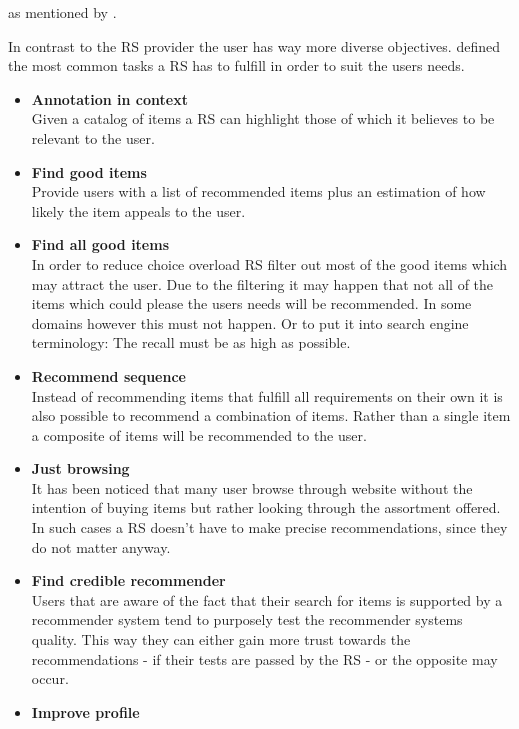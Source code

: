 as mentioned by \citeauthor{ricci:2011}.\citep[p.~4-5]{ricci:2011}


In contrast to the RS provider the user has way more diverse objectives.
\citeauthor{herlocker:2004} defined the most common tasks a RS has to fulfill in order to suit the users needs.
\begin{itemize}
    \item\textbf{Annotation in context}\hfill\\
        Given a catalog of items a RS can highlight those of which it believes to be relevant to the user.
    \item\textbf{Find good items}\hfill\\
        Provide users with a list of recommended items plus an estimation of how likely the item appeals to the user.
    \item\textbf{Find all good items}\hfill\\
        In order to reduce choice overload RS filter out most of the good items which may attract the user.
        Due to the filtering it may happen that not all of the items which could please the users needs will be recommended.
        In some domains however this must not happen.
        Or to put it into search engine terminology: The recall must be as high as possible.
    \item\textbf{Recommend sequence}\hfill\\
        Instead of recommending items that fulfill all requirements on their own it is also possible to recommend a combination of items.
        Rather than a single item a composite of items will be recommended to the user.
    \item\textbf{Just browsing}\hfill\\
        It has been noticed that many user browse through website without the intention of buying items but rather looking through the assortment offered.
        In such cases a RS doesn't have to make precise recommendations, since they do not matter anyway.
    \item\textbf{Find credible recommender}\hfill\\
        Users that are aware of the fact that their search for items is supported by a recommender system tend to purposely test the recommender systems quality.
        This way they can either gain more trust towards the recommendations - if their tests are passed by the RS - or the opposite may occur.
    \item\textbf{Improve profile}\hfill\\

\end{itemize}
